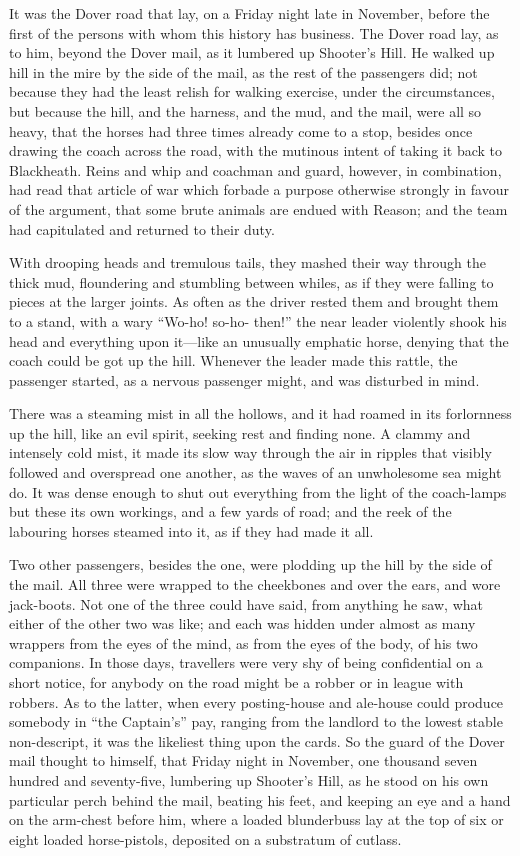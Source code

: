 It was the Dover road that lay, on a Friday night late in November,
before the first of the persons with whom this history has business.
The Dover road lay, as to him, beyond the Dover mail, as it
lumbered up Shooter's Hill.  He walked up hill in the mire
by the side of the mail, as the rest of the passengers did;
not because they had the least relish for walking exercise, under the
circumstances, but because the hill, and the harness, and the mud,
and the mail, were all so heavy, that the horses had three times
already come to a stop, besides once drawing the coach across the road,
with the mutinous intent of taking it back to Blackheath.  Reins and whip
and coachman and guard, however, in combination, had read that article
of war which forbade a purpose otherwise strongly in favour of the argument,
that some brute animals are endued with Reason; and the team had capitulated
and returned to their duty.

With drooping heads and tremulous tails, they mashed their way
through the thick mud, floundering and stumbling between whiles,
as if they were falling to pieces at the larger joints.  As often
as the driver rested them and brought them to a stand, with a
wary ``Wo-ho! so-ho- then!'' the near leader violently shook his
head and everything upon it---like an unusually emphatic horse,
denying that the coach could be got up the hill.  Whenever the
leader made this rattle, the passenger started, as a nervous
passenger might, and was disturbed in mind.

There was a steaming mist in all the hollows, and it had roamed
in its forlornness up the hill, like an evil spirit, seeking rest
and finding none.  A clammy and intensely cold mist, it made its
slow way through the air in ripples that visibly followed and
overspread one another, as the waves of an unwholesome sea might
do.  It was dense enough to shut out everything from the light of
the coach-lamps but these its own workings, and a few yards of
road; and the reek of the labouring horses steamed into it, as if
they had made it all.

Two other passengers, besides the one, were plodding up the hill
by the side of the mail.  All three were wrapped to the cheekbones
and over the ears, and wore jack-boots.  Not one of the three
could have said, from anything he saw, what either of the other
two was like; and each was hidden under almost as many wrappers
from the eyes of the mind, as from the eyes of the body, of his
two companions.  In those days, travellers were very shy of being
confidential on a short notice, for anybody on the road might be
a robber or in league with robbers.  As to the latter, when every
posting-house and ale-house could produce somebody in ``the Captain's''
pay, ranging from the landlord to the lowest stable non-descript,
it was the likeliest thing upon the cards.  So the guard of the
Dover mail thought to himself, that Friday night in November, one
thousand seven hundred and seventy-five, lumbering up Shooter's
Hill, as he stood on his own particular perch behind the mail,
beating his feet, and keeping an eye and a hand on the arm-chest
before him, where a loaded blunderbuss lay at the top of six or
eight loaded horse-pistols, deposited on a substratum of cutlass.

